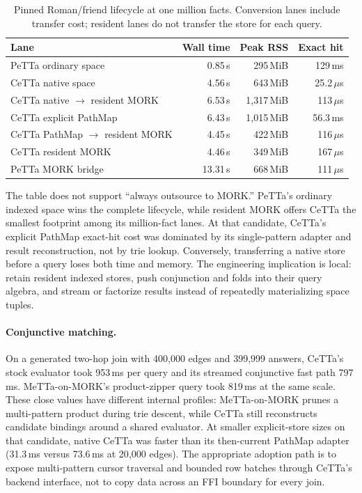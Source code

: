 \documentclass[11pt]{article}
\newcommand{\PeTTa}{\textup{PeTTa}}
\newcommand{\CeTTa}{\textup{CeTTa}}
\newcommand{\PathMap}{\textup{PathMap}}
\begin{document}
\begin{table}[htbp]
\centering
\begin{tabular}{lrrr}
\toprule
Lane & Wall time & Peak RSS & Exact hit \\
\midrule
\PeTTa{} ordinary space & 0.85\,s & 295\,MiB & 129\,ms \\
\CeTTa{} native space & 4.56\,s & 643\,MiB & 25.2\,$\mu$s \\
\CeTTa{} native $\rightarrow$ resident MORK & 6.53\,s & 1{,}317\,MiB & 113\,$\mu$s \\
\CeTTa{} explicit \PathMap{} & 6.43\,s & 1{,}015\,MiB & 56.3\,ms \\
\CeTTa{} \PathMap{} $\rightarrow$ resident MORK & 4.45\,s & 422\,MiB & 116\,$\mu$s \\
\CeTTa{} resident MORK & 4.46\,s & 349\,MiB & 167\,$\mu$s \\
\PeTTa{} MORK bridge & 13.31\,s & 668\,MiB & 111\,$\mu$s \\
\bottomrule
\end{tabular}
\caption{Pinned Roman/friend lifecycle at one million facts.
Conversion lanes include transfer cost; resident lanes do not transfer the
store for each query.}
\label{tab:roman-friend-refresh}
\end{table}

The table does not support ``always outsource to MORK.''  \PeTTa{}'s
ordinary indexed space wins the complete lifecycle, while resident MORK
offers \CeTTa{} the smallest footprint among its million-fact lanes.
At that candidate, \CeTTa{}'s explicit \PathMap{} exact-hit cost was
dominated by its single-pattern adapter and result reconstruction, not by
trie lookup.
Conversely, transferring a native store before a query loses both time and
memory.  The engineering implication is local: retain resident indexed
stores, push conjunction and folds into their query algebra, and stream or
factorize results instead of repeatedly materializing space tuples.

\paragraph{Conjunctive matching.}
On a generated two-hop join with 400{,}000 edges and 399{,}999 answers,
\CeTTa{}'s stock evaluator took 953\,ms per query and its streamed
conjunctive fast path 797\,ms.  MeTTa-on-MORK's product-zipper query took
819\,ms at the same scale.  These close values have different internal
profiles: MeTTa-on-MORK prunes a multi-pattern product during trie descent,
while \CeTTa{} still reconstructs candidate bindings around a shared
evaluator.  At smaller explicit-store sizes on that candidate, native
\CeTTa{} was faster than its then-current \PathMap{} adapter (31.3\,ms
versus 73.6\,ms at 20{,}000 edges).  The appropriate adoption path is to expose
multi-pattern cursor traversal and bounded row batches through \CeTTa{}'s
backend interface, not to copy data across an FFI boundary for every join.
\end{document}
